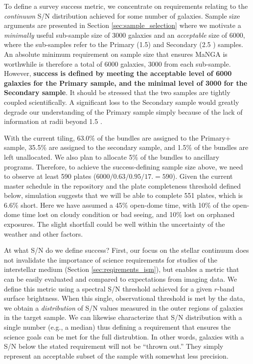 \documentclass[11pt,a4paper,twoside,onecolumn,openany,final,oldfontcommands]{memoir}
\begin{document}
To define a survey success metric, we concentrate on requirements relating to the {\em continuum} S/N distribution achieved for some number of galaxies.  Sample size arguments are presented in Section \ref{sec:sample_selection} where we motivate a {\em minimally} useful sub-sample size of 3000 galaxies and an {\em acceptable} size of 6000, where the sub-samples refer to the Primary (1.5\Reff) and Secondary (2.5 \Reff) samples.  An absolute minimum requirement on sample size that ensures MaNGA is worthwhile is therefore a total of 6000 galaxies, 3000 from each sub-sample. However, \textbf{success is defined by meeting the acceptable level of 6000 galaxies for the Primary sample, and the minimal level of 3000 for the Secondary sample}.  It should be stressed that the two samples are tightly coupled scientifically.  A significant loss to the Secondary sample would greatly degrade our understanding of the Primary sample simply because of the lack of information at radii beyond 1.5 \Reff.

With the current tiling, 63.0\% of the bundles are assigned to the Primary+ sample, 35.5\% are assigned to the secondary sample, and 1.5\% of the bundles are left unallocated. We also plan to allocate 5\% of the bundles to ancillary programs. Therefore, to achieve the success-defining sample size above, we need to observe at least 590 plates ($6000/0.63/0.95/17.= 590$). Given the current master schedule in the repository and the plate completeness threshold defined below, simulation suggests that we will be able to complete 551 plates, which is 6.6\% short. Here we have assumed a 45\% open-dome time, with 10\% of the open-dome time lost on cloudy condition or bad seeing, and 10\% lost on orphaned exposures. The slight shortfall could be well within the uncertainty of the weather and other factors. 

At what S/N do we define success? First, our focus on the stellar continuum does not invalidate the importance of science requirements for studies of the interstellar medium (Section \ref{sec:reqirements_ism}), but enables a metric that can be easily evaluated and compared to expectations from imaging data.  We define this metric using a spectral S/N threshold achieved for a given $r$-band surface brightness.  When this single, observational threshold is met by the data, we obtain a {\em distribution} of S/N values measured in the outer regions of galaxies in the target sample. We can likewise characterize that S/N distribution with a single number (e.g., a median) thus defining a requirement that ensures the science goals can be met for the full distrubtion.  In other words, galaxies with a S/N below the stated requirement will not be ``thrown out.''  They simply represent an acceptable subset of the sample with somewhat less precision.
\end{document}
